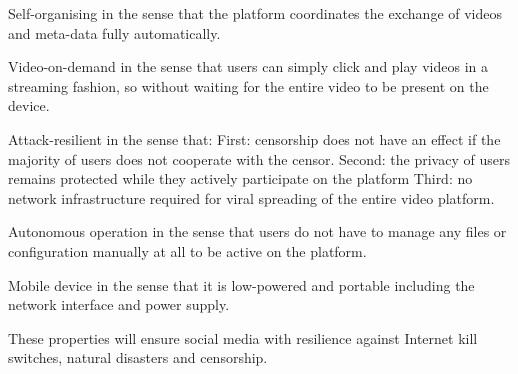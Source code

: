 Self-organising in the sense that the platform coordinates the exchange of videos and meta-data fully automatically.

Video-on-demand in the sense that users can simply click and play videos in a streaming fashion, so without waiting for the entire video to be present on the device.

Attack-resilient in the sense that:
First: censorship does not have an effect if the majority of users does not cooperate with the censor.
Second: the privacy of users remains protected while they actively participate on the platform
Third: no network infrastructure required for viral spreading of the entire video platform.

Autonomous operation in the sense that users do not have to manage any files or configuration manually at all to be active on the platform.

Mobile device in the sense that it is low-powered and portable including the network interface and power supply.

These properties will ensure social media with resilience against Internet kill switches, natural disasters and censorship.
